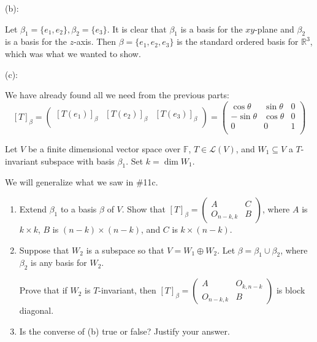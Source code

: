 \documentclass{eh-homework}
\begin{document}
\begin{question}{11}
        \medskip

        (b):

        Let \(\beta_1 = \{ e_1, e_2 \}, \beta _2 = \{ e_3 \}\). It is clear that \(\beta _1\) is a basis for the \(xy\)-plane and \(\beta _2\) is a basis for the \(z\)-axis. Then \(\beta = \{ e_1, e_2, e_3 \}\) is the standard ordered basis for \(\mathbb{R}^3\), which was what we wanted to show.

        \medskip

        (c):

        We have already found all we need from the previous parts:
        \[
            [T]_\beta = \begin{pmatrix}
                [T(e_1)]_\beta & [T(e_2)]_\beta &  [T(e_3)]_\beta \\
            \end{pmatrix}
            =
            \begin{pmatrix}
                \cos \theta & \sin \theta &  0 \\
                -\sin \theta & \cos \theta &  0 \\
                0 & 0 &  1 \\
            \end{pmatrix}
        \]
    \end{question}

    \begin{question}{12}
        Let \( V \) be a finite dimensional vector space over \( \mathbb{F} \), \( T \in \mathcal{L}(V) \), and \( W_1 \subseteq V \) a \( T \)-invariant subspace with basis \( \beta_1 \). Set \( k = \dim W_1 \).

        We will generalize what we saw in \#11c.

        \begin{enumerate}[label=(\alph*)]
            \item Extend \( \beta_1 \) to a basis \( \beta \) of \( V \). Show that \( [T]_\beta = \begin{pmatrix} A & C \\ O_{n-k,k} & B \end{pmatrix} \), where \( A \) is \( k \times k \), \( B \) is \( (n-k) \times (n-k) \), and \( C \) is \( k \times (n-k) \).
            \item Suppose that \( W_2 \) is a subspace so that \( V = W_1 \oplus W_2 \). Let \( \beta = \beta_1 \cup \beta_2 \), where \( \beta_2 \) is any basis for \( W_2 \).

            Prove that if \( W_2 \) is \( T \)-invariant, then \( [T]_\beta = \begin{pmatrix} A & O_{k,n-k} \\ O_{n-k,k} & B \end{pmatrix} \) is block diagonal.
            \item Is the converse of (b) true or false? Justify your answer.
        \end{enumerate}
    \end{question}
\end{document}
